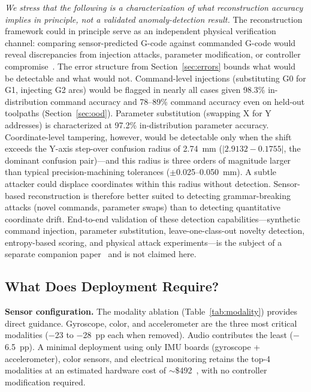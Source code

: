 \documentclass[sensors,article,submit,moreauthors,pdftex]{Definitions/mdpi}
\begin{document}
\emph{We stress that the following is a characterization of what reconstruction accuracy implies in principle, not a validated anomaly-detection result.} The reconstruction framework could in principle serve as an independent physical verification channel: comparing sensor-predicted G-code against commanded G-code would reveal discrepancies from injection attacks, parameter modification, or controller compromise~\cite{sturm2014cyber,yampolskiy2018security}. The error structure from Section~\ref{sec:errors} bounds what would be detectable and what would not. Command-level injections (substituting G0 for G1, injecting G2 arcs) would be flagged in nearly all cases given 98.3\% in-distribution command accuracy and 78--89\% command accuracy even on held-out toolpaths (Section~\ref{sec:ood}). Parameter substitution (swapping X for Y addresses) is characterized at 97.2\% in-distribution parameter accuracy. Coordinate-level tampering, however, would be detectable only when the shift exceeds the Y-axis step-over confusion radius of 2.74~mm ($|2.9132 - 0.1755|$, the dominant confusion pair)---and this radius is three orders of magnitude larger than typical precision-machining tolerances ($\pm$0.025--0.050~mm). A subtle attacker could displace coordinates within this radius without detection. Sensor-based reconstruction is therefore better suited to detecting grammar-breaking attacks (novel commands, parameter swaps) than to detecting quantitative coordinate drift. End-to-end validation of these detection capabilities---synthetic command injection, parameter substitution, leave-one-class-out novelty detection, entropy-based scoring, and physical attack experiments---is the subject of a separate companion paper~\cite{anomaly_paper} and is not claimed here.

\subsection{What Does Deployment Require?}

\textbf{Sensor configuration.} The modality ablation (Table~\ref{tab:modality}) provides direct guidance. Gyroscope, color, and accelerometer are the three most critical modalities ($-$23 to $-$28~pp each when removed). Audio contributes the least ($-$6.5~pp). A minimal deployment using only IMU boards (gyroscope + accelerometer), color sensors, and electrical monitoring retains the top-4 modalities at an estimated hardware cost of $\sim$\$492~\cite{encoder_paper}, with no controller modification required.
\end{document}
